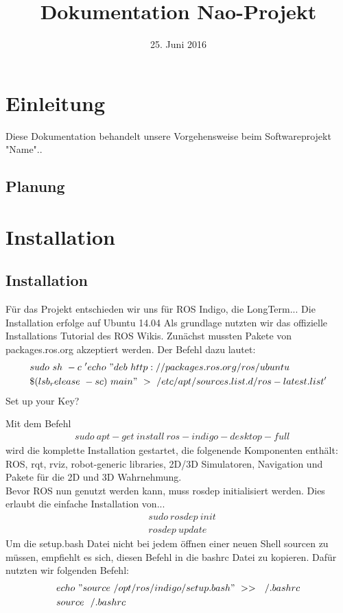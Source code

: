 \documentclass{scrartcl}
\title{Dokumentation Nao-Projekt}
\date{25. Juni 2016}
\begin{document}
\maketitle
\tableofcontents


\section{Einleitung}

Diese Dokumentation behandelt unsere Vorgehensweise beim Softwareprojekt "Name"..

\subsection{Planung}

\section{Installation}


\subsection{Installation}
Für das Projekt entschieden wir uns für ROS Indigo, die LongTerm... 
Die Installation erfolge auf Ubuntu 14.04 
Als grundlage nutzten wir das offizielle Installations Tutorial des ROS Wikis.
Zunächst mussten Pakete von packages.ros.org akzeptiert werden. Der Befehl dazu lautet: 
\begin{align}
&sudo\ sh\ -c\ 'echo\ "deb\ http://packages.ros.org/ros/ubuntu \\ 
&\$(lsb_release\ -sc)\ main"\ >\ /etc/apt/sources.list.d/ros-latest.list'
\end{align}
Set up your Key?

Mit dem Befehl 
\begin{align}
&sudo\ apt-get\ install\ ros-indigo-desktop-full
\end{align}
wird die komplette Installation gestartet, die folgenende Komponenten enthält: ROS, rqt, rviz, robot-generic libraries, 2D/3D Simulatoren, Navigation und Pakete für die 2D und 3D Wahrnehmung.
\\

Bevor ROS nun genutzt werden kann, muss rosdep initialisiert werden. Dies erlaubt die einfache Installation von...
\begin{align}
&sudo\ rosdep\ init\\
&rosdep\ update
\end{align}
Um die setup.bash Datei nicht bei jedem öffnen einer neuen Shell sourcen zu müssen, empfiehlt es sich, diesen Befehl in die bashrc Datei zu kopieren.
Dafür nutzten wir folgenden Befehl:
\begin{align}
&echo\ "source\ /opt/ros/indigo/setup.bash"\ >>\ ~/.bashrc\\
&source\ ~/.bashrc
\end{align}
\end{document}
